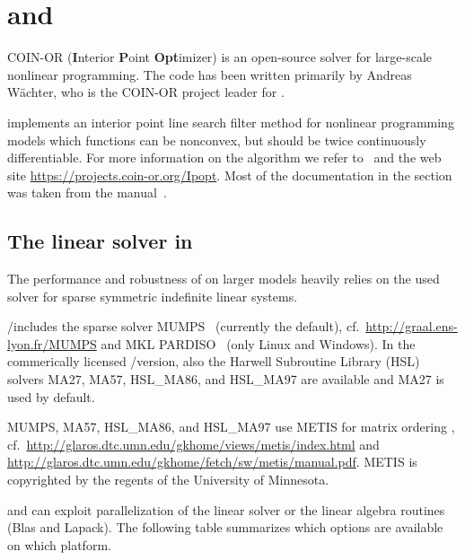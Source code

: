 \chapter{\IPOPT and \IPOPTH}
\label{cha:ipopt}


COIN-OR \IPOPT (\textbf{I}nterior \textbf{P}oint \textbf{Opt}imizer) is an open-source solver for large-scale nonlinear programming.
The code has been written primarily by Andreas W\"achter, who is the COIN-OR project leader for \IPOPT.

\IPOPT implements an interior point line search filter method for nonlinear programming models which functions can be nonconvex, but should be twice continuously differentiable.
For more information on the algorithm we refer to~\cite{NoWaWa08,Waechter2002,WaBi05b,WaBi05a,WaBi2006} and the \IPOPT web site \url{https://projects.coin-or.org/Ipopt}.
Most of the \IPOPT documentation in the section was taken from the \IPOPT manual~\cite{IpoptManual}.



\section{The linear solver in \IPOPT}
\label{sec:ipoptlinearsolver}
\hypertarget{ipoptlinearsolver}{}

The performance and robustness of \IPOPT on larger models heavily relies on the used solver for sparse symmetric indefinite linear systems.

\GAMS/\IPOPT includes the sparse solver \textsc{MUMPS}~\cite{AmestoyDuffKosterLExcellent2001,AmestoyGuermoucheLExcellentPralet2006} (currently the default), cf.~\url{http://graal.ens-lyon.fr/MUMPS} and \textsc{MKL PARDISO}~\cite{SchGa04,SchGa06} (only Linux and Windows).
In the commerically licensed \GAMS/\IPOPTH version, also the Harwell Subroutine Library (HSL) solvers \textsc{MA27}, \textsc{MA57}, \textsc{HSL\_MA86}, and \textsc{HSL\_MA97} are available and MA27 is used by default.

\textsc{MUMPS}, \textsc{MA57}, \textsc{HSL\_MA86}, and \textsc{HSL\_MA97} use \textsc{METIS} for matrix ordering \cite{KaKu99}, cf.~\url{http://glaros.dtc.umn.edu/gkhome/views/metis/index.html} and \url{http://glaros.dtc.umn.edu/gkhome/fetch/sw/metis/manual.pdf}.
\textsc{METIS} is copyrighted by the regents of the University of Minnesota.

\IPOPT and \IPOPTH can exploit parallelization of the linear solver or the linear algebra routines (Blas and Lapack).
The following table summarizes which options are available on which platform.

